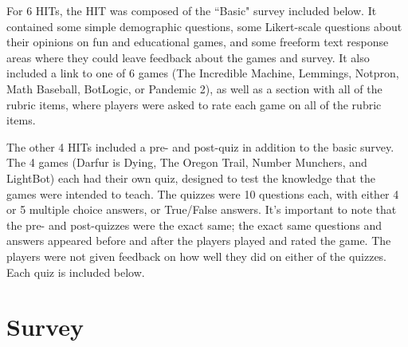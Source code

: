 		For 6 HITs, the HIT was composed of the ``Basic" survey included below. It contained some simple demographic questions, some Likert-scale questions about their opinions on fun and educational games, and some freeform text response areas where they could leave feedback about the games and survey. It also included a link to one of 6 games (The Incredible Machine, Lemmings, Notpron, Math Baseball, BotLogic, or Pandemic 2), as well as a section with all of the rubric items, where players were asked to rate each game on all of the rubric items.

		The other 4 HITs included a pre- and post-quiz in addition to the basic survey. The 4 games (Darfur is Dying, The Oregon Trail, Number Munchers, and LightBot) each had their own quiz, designed to test the knowledge that the games were intended to teach. The quizzes were 10 questions each, with either 4 or 5 multiple choice answers, or True/False answers. It's important to note that the pre- and post-quizzes were the exact same; the exact same questions and answers appeared before and after the players played and rated the game. The players were not given feedback on how well they did on either of the quizzes. Each quiz is included below.  

	\section{Survey}






\newpage
	

